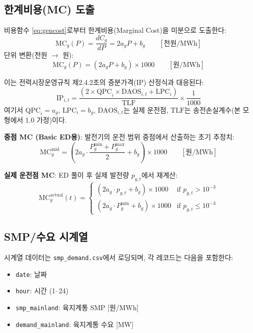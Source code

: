 \documentclass[11pt, a4paper]{article}
\begin{document}
\subsection{한계비용(MC) 도출}\label{sec:mc_derivation}

비용함수 \eqref{eq:gencost}로부터 한계비용(Marginal Cost)을 미분으로 도출한다:
\begin{equation}\label{eq:mc}
    \text{MC}_g(P) = \frac{dC_g}{dP} = 2a_g P + b_g \qquad [\text{천원/MWh}]
\end{equation}
단위 변환(천원 $\to$ 원):
\begin{equation}\label{eq:mc_won}
    \boxed{\text{MC}_g(P) = (2a_g P + b_g) \times 1000 \qquad [\text{원/MWh}]}
\end{equation}

이는 전력시장운영규칙 제2.4.2조의 증분가격(IP) 산정식과 대응된다:
\begin{equation}\label{eq:ip_rule}
    \text{IP}_{i,t} = \frac{(2 \times \text{QPC}_i \times \text{DAOS}_{i,t} + \text{LPC}_i)}{\text{TLF}} \times \frac{1}{1000}
\end{equation}
여기서 $\text{QPC}_i = a_g$, $\text{LPC}_i = b_g$, $\text{DAOS}_{i,t}$는 실제 운전점,
$\text{TLF}$는 송전손실계수(본 모형에서 1.0 가정)이다.

\textbf{중점 MC (Basic ED용)}: 발전기의 운전 범위 중점에서 산출하는 초기 추정치:
\begin{equation}\label{eq:mc_mid}
    \text{MC}_g^{\text{mid}} = \left(2a_g \cdot \frac{P_g^{\min} + P_g^{\max}}{2} + b_g\right) \times 1000 \qquad [\text{원/MWh}]
\end{equation}

\textbf{실제 운전점 MC}: ED 풀이 후 실제 발전량 $p_{g,t}$에서 재계산:
\begin{equation}\label{eq:mc_actual}
    \text{MC}_g^{\text{actual}}(t) = \begin{cases}
        (2a_g \cdot p_{g,t} + b_g) \times 1000 & \text{if } p_{g,t} > 10^{-3} \\
        (2a_g \cdot P_g^{\min} + b_g) \times 1000 & \text{if } p_{g,t} \leq 10^{-3}
    \end{cases}
\end{equation}

\subsection{SMP/수요 시계열}

시계열 데이터는 \texttt{smp\_demand.csv}에서 로딩되며, 각 레코드는 다음을 포함한다:
\begin{itemize}[noitemsep]
    \item \texttt{date}: 날짜
    \item \texttt{hour}: 시간 (1--24)
    \item \texttt{smp\_mainland}: 육지계통 SMP [원/MWh]
    \item \texttt{demand\_mainland}: 육지계통 수요 [MW]
\end{itemize}
\end{document}
